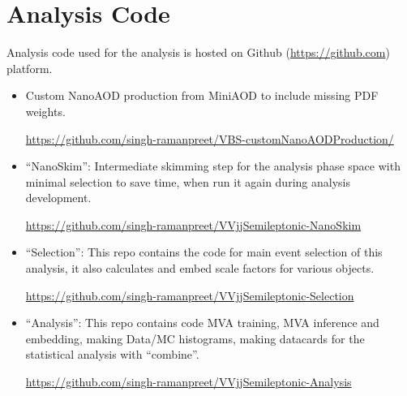 \chapter{
  Analysis Code
 }


Analysis code used for the analysis is hosted on
Github (\url{https://github.com}) platform.

\begin{itemize}
      \item Custom NanoAOD production from MiniAOD
            to include missing \gls{PDF} weights.

            \url{https://github.com/singh-ramanpreet/VBS-customNanoAODProduction/}

      \item ``NanoSkim'': Intermediate skimming step for the analysis
            phase space with minimal selection to save time,
            when run it again during analysis development.

            \url{https://github.com/singh-ramanpreet/VVjjSemileptonic-NanoSkim}

      \item ``Selection'': This repo contains the code for main event
            selection of this analysis, it also calculates and embed scale factors
            for various objects.

            \url{https://github.com/singh-ramanpreet/VVjjSemileptonic-Selection}

      \item ``Analysis'': This repo contains code \gls{MVA} training,
            \gls{MVA} inference and embedding, making Data/MC histograms,
            making datacards for the statistical analysis with ``combine''.

            \url{https://github.com/singh-ramanpreet/VVjjSemileptonic-Analysis}

\end{itemize}

